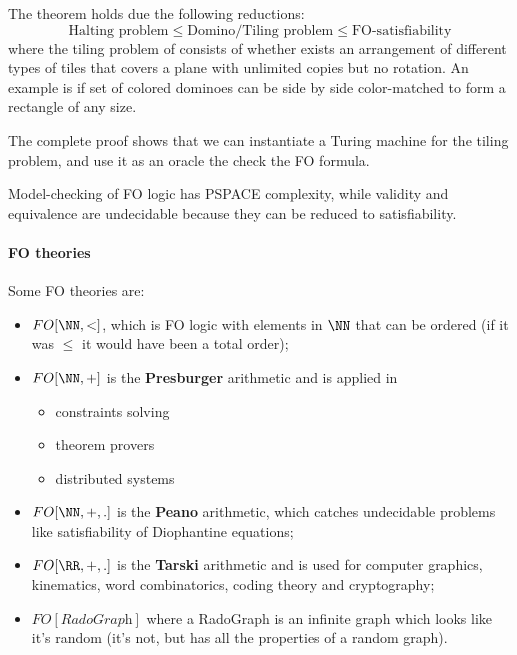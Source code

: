 \documentclass[oneside]{academica}
\begin{document}
\begin{proof*}
  The theorem holds due the following reductions:
  \begin{equation*}
    \text{Halting problem} \leq \text{Domino/Tiling problem} \leq \text{FO-satisfiability}
  \end{equation*}
  where the tiling problem of consists of whether exists an arrangement of different types of tiles that covers a plane with unlimited copies but no rotation.
  An example is if set of colored dominoes can be side by side color-matched to form a rectangle of any size.

  The complete proof shows that we can instantiate a Turing machine for the tiling problem, and use it as an oracle the check the FO formula.
\end{proof*}

Model-checking of FO logic has PSPACE complexity, while validity and equivalence are undecidable because they can be reduced to satisfiability.

\paragraph{FO theories}

Some FO theories are:
\begin{itemize}
  \item $FO[\NN,<]$, which is FO logic with elements in $\NN$ that can be ordered (if it was $\leqslant$ it would have been a total order);
  \item $FO[\NN,+]$ is the \textbf{Presburger} arithmetic and is applied in
  \begin{itemize}
    \item constraints solving
    \item theorem provers
    \item distributed systems
  \end{itemize}
  \item $FO[\NN,+,.]$ is the \textbf{Peano} arithmetic, which catches undecidable problems like satisfiability of Diophantine equations;
  \item $FO[\RR,+,.]$ is the \textbf{Tarski} arithmetic and is used for computer graphics, kinematics, word combinatorics, coding theory and cryptography;
  \item $FO[\textit{RadoGraph}]$ where a RadoGraph is an infinite graph which looks like it's random (it's not, but has all the properties of a random graph).
\end{itemize}
\end{document}
